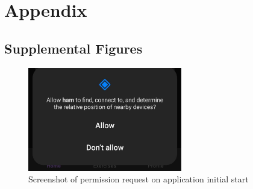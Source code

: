 \appendix


\chapter{Appendix}

\section{Supplemental Figures}


\begin{figure}[H]
    \centering
    \includegraphics[width=0.6\textwidth]{images/permission-request.jpeg}
    \caption{Screenshot of permission request on application initial start}
    \label{fig:req_permission}
\end{figure}